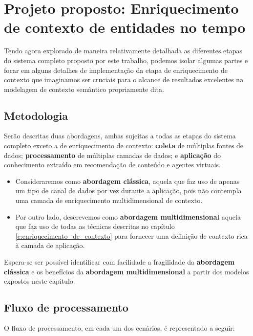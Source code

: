 \chapter{Projeto proposto: Enriquecimento de contexto de entidades no tempo}

Tendo agora explorado de maneira relativamente detalhada as diferentes etapas do sistema completo proposto por este trabalho, podemos isolar algumas partes e focar em alguns detalhes de implementação da etapa de enriquecimento de contexto que imaginamos ser cruciais para o alcance de resultados excelentes na modelagem de contexto semântico propriamente dita.

\section{Metodologia}

Serão descritas duas abordagens, ambas sujeitas a todas as etapas do sistema completo exceto a de enriquecimento de contexto: \textbf{coleta} de múltiplas fontes de dados; \textbf{processamento} de múltiplas camadas de dados; e \textbf{aplicação} do conhecimento extraído em recomendação de conteúdo e agentes virtuais. 

\begin{itemize}
    \item Consideraremos como \textbf{abordagem clássica}, aquela que faz uso de apenas um tipo de canal de dados por vez durante a aplicação, pois não contempla uma camada de enriquecimento multidimensional de contexto.
    \item  Por outro lado, descrevemos como \textbf{abordagem multidimensional} aquela que faz uso de todas as técnicas descritas no capítulo \ref{c:enriquecimento_de_contexto} para fornecer uma definição de contexto rica à camada de aplicação.
\end{itemize}

Espera-se ser possível identificar com facilidade a fragilidade da \textbf{abordagem clássica} e os benefícios da \textbf{abordagem multidimensional} a partir dos modelos expostos neste capítulo.

\newpage

\section{Fluxo de processamento}

O fluxo de processamento, em cada um dos cenários, é representado a seguir:

